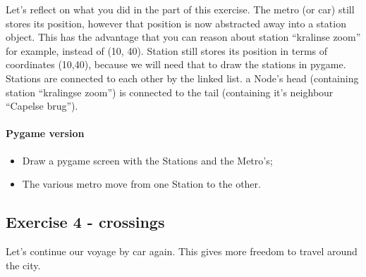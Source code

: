         Let's reflect on what you did in the part of this exercise.
        The metro (or car) still stores its position, however that position is now abstracted away into a station object.
        This has the advantage that you can reason about station ``kralinse zoom'' for example, instead of (10, 40).
        Station still stores its position in terms of coordinates (10,40), because we will need that to draw the stations in pygame.
        Stations are connected to each other by the linked list. a Node's head (containing station ``kralingse zoom'') is connected to the tail (containing it's neighbour ``Capelse brug'').


        \paragraph*{Pygame version}
        \begin{itemize}
            \item Draw a pygame screen with the Stations and the Metro's;
            \item The various metro move from one Station to the other.
        \end{itemize}

    \subsection{Exercise 4 - crossings}
        Let's continue our voyage by car again. This gives more freedom to travel around the city.
